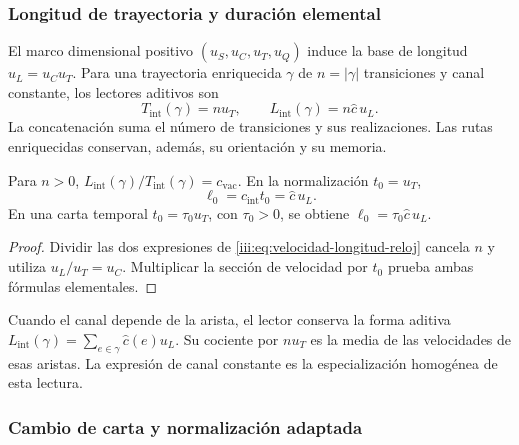 \subsubsection{Longitud de trayectoria y duración elemental}

El marco dimensional positivo $(u_S,u_C,u_T,u_Q)$ induce la base de
longitud $u_L=u_Cu_T$. Para una trayectoria enriquecida $\gamma$ de
$n=|\gamma|$ transiciones y canal constante, los lectores aditivos son
\begin{equation}
 T_{\mathrm{int}}(\gamma)=nu_T,
 \qquad L_{\mathrm{int}}(\gamma)=n\widehat c\,u_L.
 \label{iii:eq:velocidad-longitud-reloj}
\end{equation}
La concatenación suma el número de transiciones y sus realizaciones.
Las rutas enriquecidas conservan, además, su orientación y su memoria.

\begin{corollary}
Para $n>0$, $L_{\mathrm{int}}(\gamma)/T_{\mathrm{int}}(\gamma)
=c_{\mathrm{vac}}$. En la normalización $t_0=u_T$,
\begin{equation}
 \ell_0=c_{\mathrm{int}}t_0=\widehat c\,u_L.
 \label{iii:eq:longitud-elemental-constitutiva}
\end{equation}
En una carta temporal $t_0=\tau_0u_T$, con $\tau_0>0$, se obtiene
$\ell_0=\tau_0\widehat c\,u_L$.
\end{corollary}
\begin{proof}
Dividir las dos expresiones de \eqref{iii:eq:velocidad-longitud-reloj}
cancela $n$ y utiliza $u_L/u_T=u_C$. Multiplicar la sección de velocidad
por $t_0$ prueba ambas fórmulas elementales.
\end{proof}

Cuando el canal depende de la arista, el lector conserva la forma aditiva
$L_{\mathrm{int}}(\gamma)=\sum_{e\in\gamma}\widehat c(e)u_L$.
Su cociente por $nu_T$ es la media de las velocidades de esas aristas.
La expresión de canal constante es la especialización homogénea de
esta lectura.

\subsubsection{Cambio de carta y normalización adaptada}

